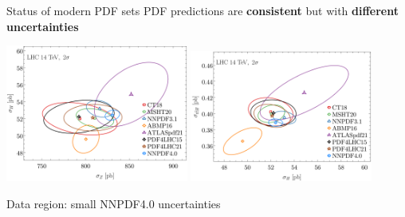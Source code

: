 \documentclass[aspectratio=169,9pt]{beamer}
\begin{document}
\begin{frame}{Status of modern PDF sets}
    PDF predictions are {\bfseries consistent} but with {\bfseries different uncertainties}
	\begin{center}
		\includegraphics[width=0.45\textwidth]{ZH_xsec_fixed.png}
		\includegraphics[width=0.45\textwidth]{HttbarH_xsec_fixed.png}
	\end{center}
    \begin{center}
        Data region: small NNPDF4.0 uncertainties
	\end{center}
\end{frame}
\end{document}
